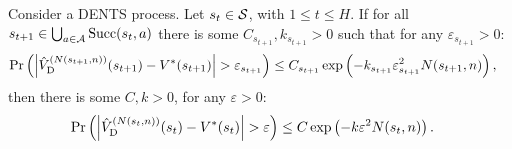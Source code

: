     \begin{lemma} \label{lem:dents_val_induction_step}
        Consider a DENTS process. Let $s_t\in\mathcal{S}$, with $1\leq t \leq H$.  If for all $s_{t+1}\in\bigcup_{a\in\mathcal{A}}{\textnormal{Succ}(s_t,a)}$ there is some $C_{s_{t+1}},k_{s_{t+1}}>0$ such that for any $\varepsilon_{s_{t+1}}>0$:
        \begin{align}
            \Pr\left(\left| {\hat{V}^{(N(s_{t+1},n))}_{{\textnormal{D}}}}(s_{t+1}) - V^*(s_{t+1}) \right| > \varepsilon_{s_{t+1}} \right) 
                &\leq C_{s_{t+1}}\exp\left( -k_{s_{t+1}}\varepsilon_{s_{t+1}}^2 N(s_{t+1},n) \right), 
        \end{align}
        then there is some $C,k>0$, for any $\varepsilon>0$:
        \begin{align}
            \Pr\left(\left| {\hat{V}^{(N(s_{t},n))}_{{\textnormal{D}}}}(s_{t}) - V^*(s_t) \right| > \varepsilon \right) 
                &\leq C\exp\left( -k\varepsilon^2 N(s_{t},n) \right).
        \end{align}
    \end{lemma}
